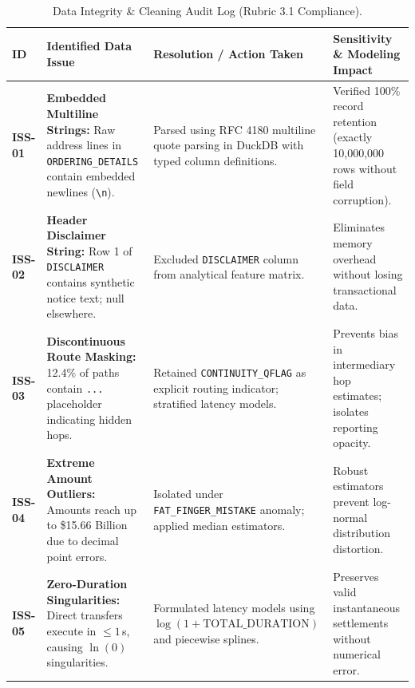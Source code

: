 \documentclass[11pt,a4paper]{article}
\begin{document}
\begin{table}[H]
\centering\small
\caption{Data Integrity \& Cleaning Audit Log (Rubric 3.1 Compliance).}
\label{tab:data_issues}
\renewcommand{\arraystretch}{1.25}
\begin{tabularx}{\textwidth}{@{}p{1.5cm} >{\raggedright\arraybackslash}p{4.2cm} >{\raggedright\arraybackslash}p{4.8cm} >{\raggedright\arraybackslash}X@{}}
\toprule
\textbf{ID} & \textbf{Identified Data Issue} & \textbf{Resolution / Action Taken} & \textbf{Sensitivity \& Modeling Impact} \\ \midrule
\textbf{ISS-01} & \textbf{Embedded Multiline Strings:} Raw address lines in \texttt{ORDERING\_DETAILS} contain embedded newlines (\texttt{\textbackslash n}). & Parsed using RFC 4180 multiline quote parsing in DuckDB with typed column definitions. & Verified 100\% record retention (exactly 10,000,000 rows without field corruption). \\
\textbf{ISS-02} & \textbf{Header Disclaimer String:} Row 1 of \texttt{DISCLAIMER} contains synthetic notice text; null elsewhere. & Excluded \texttt{DISCLAIMER} column from analytical feature matrix. & Eliminates memory overhead without losing transactional data. \\
\textbf{ISS-03} & \textbf{Discontinuous Route Masking:} 12.4\% of paths contain \texttt{...} placeholder indicating hidden hops. & Retained \texttt{CONTINUITY\_QFLAG} as explicit routing indicator; stratified latency models. & Prevents bias in intermediary hop estimates; isolates reporting opacity. \\
\textbf{ISS-04} & \textbf{Extreme Amount Outliers:} Amounts reach up to \$15.66 Billion due to decimal point errors. & Isolated under \texttt{FAT\_FINGER\_MISTAKE} anomaly; applied median estimators. & Robust estimators prevent log-normal distribution distortion. \\
\textbf{ISS-05} & \textbf{Zero-Duration Singularities:} Direct transfers execute in $\le 1$\,s, causing $\ln(0)$ singularities. & Formulated latency models using $\log(1 + \text{TOTAL\_DURATION})$ and piecewise splines. & Preserves valid instantaneous settlements without numerical error. \\ \bottomrule
\end{tabularx}
\end{table}

\end{document}

